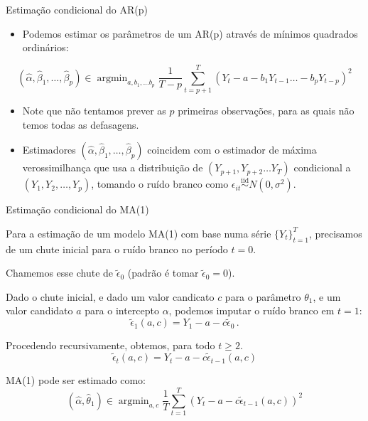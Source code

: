 \documentclass[11pt]{beamer}
\newenvironment{halfwideitemize}{\itemize\addtolength{\itemsep}{0.5em}}{\enditemize}
\begin{document}
\begin{frame}{Estimação condicional do AR(p)}
	\begin{itemize}
		\item Podemos estimar os parâmetros de um AR(p) através de mínimos quadrados ordinários:
	\end{itemize}
		\begin{equation*}
			(\hat\alpha,\hat{\beta}_1,\ldots, \hat\beta_p) \in \operatorname{argmin}_{a,b_1,\ldots b_p} \frac{1}{T-p}\sum_{t=p+1}^{T}(Y_{t}- a - b_1 Y_{t-1} \ldots - b_p Y_{t-p})^2
		\end{equation*}
				\begin{itemize}
		\item Note que não tentamos prever as $p$ primeiras observações, para as quais não temos todas as defasagens.
		\item Estimadores $	(\hat\alpha,\hat{\beta}_1,\ldots, \hat\beta_p) $ coincidem com o estimador de máxima verossimilhança que usa a distribuição de $(Y_{p+1},Y_{p+2}\ldots Y_{T})$ {\color{blue}condicional} a $(Y_1,Y_2,\ldots,Y_p)$, tomando o ruído branco como $\epsilon_{it}\overset{\text{iid}}{\sim} N(0,\sigma^2)$.
		 \end{itemize}
\end{frame}
\begin{frame}{Estimação condicional do MA(1)}
	\begin{halfwideitemize}
		\item Para a estimação de um modelo MA(1) com base numa série $\{Y_{t}\}_{t=1}^T$, precisamos de um chute inicial para o ruído branco no período $t=0$.
		\item Chamemos esse chute de $\tilde{\epsilon}_0$ (padrão é tomar  $\tilde{\epsilon}_0 = 0$).

		\item Dado o chute inicial, e dado um valor candicato $c$ para o parâmetro $\theta_1$, e um valor candidato $a$ para o intercepto $\alpha$, podemos imputar o ruído branco em $t=1$:
		$$ \tilde{\epsilon}_{1}(a,c) = Y_1 - a - c \tilde{\epsilon}_0 \, .$$
		\item Procedendo recursivamente, obtemos, para todo $t\geq 2$.
		$$ \tilde{\epsilon}_{t}(a,c) = Y_t - a - c \tilde{\epsilon}_{t-1}(a,c)$$
		\item MA(1) pode ser estimado como:
		\begin{equation*}
			(\hat \alpha, \hat \theta_1) \in \operatorname{argmin}_{a, c}\frac{1}{T}\sum_{t=1}^{T}(Y_t -a  - c\tilde{\epsilon}_{t-1}(a,c))^2
		\end{equation*}
	\end{halfwideitemize}
\end{frame}
\end{document}
